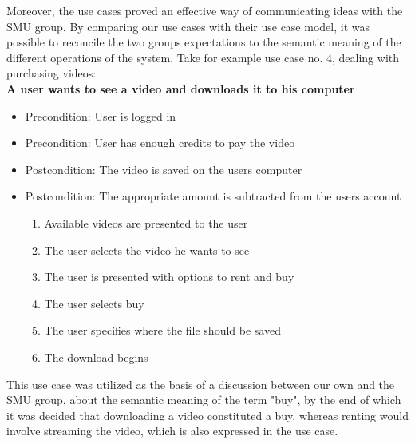 Moreover, the use cases proved an effective way of communicating ideas with the SMU group. By comparing our use cases with their use case model, it was possible to reconcile the two groups expectations to the semantic meaning of the different operations of the system. Take for example use case no. 4, dealing with purchasing videos:\\

\textbf{A user wants to see a video and downloads it to his computer}
\begin{itemize}
\item Precondition: User is logged in
\item Precondition: User has enough credits to pay the video
\item Postcondition: The video is saved on the users computer
\item Postcondition: The appropriate amount is subtracted from the users account
\begin{enumerate}
\item Available videos are presented to the user
\item The user selects the video he wants to see
\item The user is presented with options to rent and buy
\item The user selects buy
\item The user specifies where the file should be saved
\item The download begins
\end{enumerate}
\end{itemize}

This use case was utilized as the basis of a discussion between our own and the SMU group, about the semantic meaning of the term "buy", by the end of which it was decided that downloading a video constituted a buy, whereas renting would involve streaming the video, which is also expressed in the use case.
